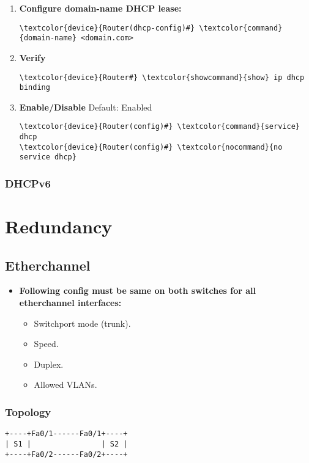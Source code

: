 \documentclass[10pt, a4paper, onecolumn, oneside, titlepage, openany]{book}
\begin{document}
\begin{enumerate}
\begin{Verbatim}[commandchars=\\\{\}]
\textcolor{device}{Router(dhcp-config)#} \textcolor{command}{lease} <DAYS [HOURS [MINUTES]]>
\end{Verbatim}
    \item \textbf{Configure domain-name DHCP lease:}
\begin{Verbatim}[commandchars=\\\{\}]
\textcolor{device}{Router(dhcp-config)#} \textcolor{command}{domain-name} <domain.com>
\end{Verbatim}
    \item \textbf{Verify}
\begin{Verbatim}[commandchars=\\\{\}]
\textcolor{device}{Router#} \textcolor{showcommand}{show} ip dhcp binding
\end{Verbatim}
    \item \textbf{Enable/Disable}
\newline Default: Enabled
\begin{Verbatim}[commandchars=\\\{\}]
\textcolor{device}{Router(config)#} \textcolor{command}{service} dhcp
\textcolor{device}{Router(config)#} \textcolor{nocommand}{no service dhcp}
\end{Verbatim}
\end{enumerate}
\subsection{DHCPv6}



\chapter{Redundancy}
\section{Etherchannel}
\begin{itemize}
    \item \textbf{Following config must be same on both switches for all etherchannel interfaces:}
    \begin{itemize}
        \item Switchport mode (trunk).
        \item Speed.
        \item Duplex.
        \item Allowed VLANs.
    \end{itemize}
\end{itemize}
\subsection{Topology}
\begin{verbatim}
+----+Fa0/1------Fa0/1+----+
| S1 |                | S2 |
+----+Fa0/2------Fa0/2+----+
\end{verbatim}
\end{document}
